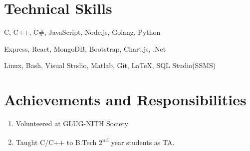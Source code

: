 \documentclass[10pt]{article}
\begin{document}
\section{Technical Skills}
\begin{description}
  \setlength{\itemindent}{\parindent}
  \setlength{\itemsep}{0em}
  \item[Languages:]{C, C++, C\#, JavaScript, Node.js, Golang, Python}
  \item[Web Technologies:]{Express, React, MongoDB, Bootstrap,  Chart.js, .Net}
  \item[Tools:]{Linux, Bash, Visual Studio, Matlab, Git, \LaTeX, SQL Studio(SSMS)}
\end{description}


\section{Achievements and Responsibilities}
\begin{enumerate}
  \setlength{\itemsep}{0em}
  \item Volunteered at GLUG-NITH Society
  \item Taught C/C++ to B.Tech 2\textsuperscript{nd} year students as TA.
\end{enumerate}
\end{document}
